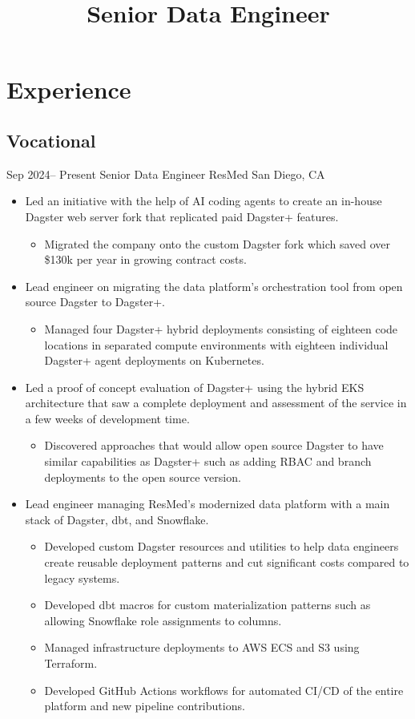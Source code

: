 \documentclass[10pt,legalpaper]{moderncv}
\title{Senior Data Engineer}
\begin{document}
\maketitle

\section{Experience}
\subsection{Vocational}
\cventry
{Sep 2024-- Present  }
{Senior Data Engineer}
{ResMed}
{San Diego, CA}
{}
{
    \begin{itemize}
        \item{Led an initiative with the help of AI coding agents to create an in-house Dagster web server fork that replicated paid Dagster+ features.}
        \begin{itemize}
\item{Migrated the company onto the custom Dagster fork which saved over \$130k per year in growing contract costs.}
        \end{itemize}
        \item{Lead engineer on migrating the data platform's orchestration tool from open source Dagster to Dagster+.}
        \begin{itemize}
            \item{Managed four Dagster+ hybrid deployments consisting of eighteen code locations in separated compute environments with eighteen individual Dagster+ agent deployments on Kubernetes.}
        \end{itemize}
        \item{Led a proof of concept evaluation of Dagster+ using the hybrid EKS architecture that saw a complete deployment and assessment of the service in a few weeks of development time.}
        \begin{itemize}
            \item{Discovered approaches that would allow open source Dagster to have similar capabilities as Dagster+ such as adding RBAC and branch deployments to the open source version.}
        \end{itemize}
        \item{Lead engineer managing ResMed's modernized data platform with a main stack of Dagster, dbt, and Snowflake.}
        \begin{itemize}
            \item{Developed custom Dagster resources and utilities to help data engineers create reusable deployment patterns and cut significant costs compared to legacy systems.}
            \item{Developed dbt macros for custom materialization patterns such as allowing Snowflake role assignments to columns.}
            \item{Managed infrastructure deployments to AWS ECS and S3 using Terraform.}
            \item{Developed GitHub Actions workflows for automated CI/CD of the entire platform and new pipeline contributions.}
        \end{itemize}
    \end{itemize}
}
\end{document}
